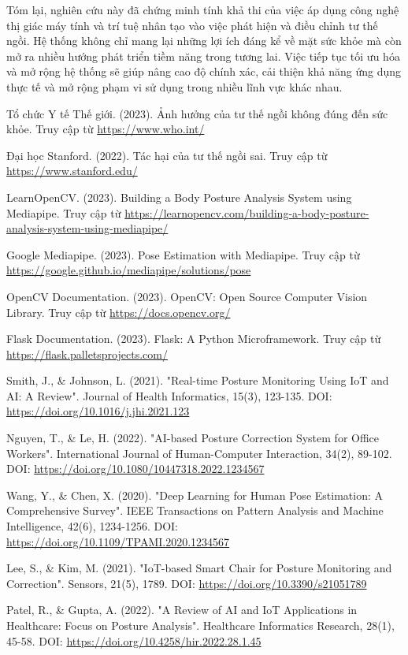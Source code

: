 \documentclass[conference]{IEEEtran}
\begin{document}
Tóm lại, nghiên cứu này đã chứng minh tính khả thi của việc áp dụng công nghệ thị giác máy tính và trí tuệ nhân tạo vào việc phát hiện và điều chỉnh tư thế ngồi. Hệ thống không chỉ mang lại những lợi ích đáng kể về mặt sức khỏe mà còn mở ra nhiều hướng phát triển tiềm năng trong tương lai. Việc tiếp tục tối ưu hóa và mở rộng hệ thống sẽ giúp nâng cao độ chính xác, cải thiện khả năng ứng dụng thực tế và mở rộng phạm vi sử dụng trong nhiều lĩnh vực khác nhau.



\begin{thebibliography}{1}
 Tổ chức Y tế Thế giới. (2023). Ảnh hưởng của tư thế ngồi không đúng đến sức khỏe. Truy cập từ \url{https://www.who.int/}

 Đại học Stanford. (2022). Tác hại của tư thế ngồi sai. Truy cập từ \url{https://www.stanford.edu/}

 LearnOpenCV. (2023). Building a Body Posture Analysis System using Mediapipe. Truy cập từ \url{https://learnopencv.com/building-a-body-posture-analysis-system-using-mediapipe/}

 Google Mediapipe. (2023). Pose Estimation with Mediapipe. Truy cập từ \url{https://google.github.io/mediapipe/solutions/pose}

 OpenCV Documentation. (2023). OpenCV: Open Source Computer Vision Library. Truy cập từ \url{https://docs.opencv.org/}

 Flask Documentation. (2023). Flask: A Python Microframework. Truy cập từ \url{https://flask.palletsprojects.com/}

 Smith, J., \& Johnson, L. (2021). "Real-time Posture Monitoring Using IoT and AI: A Review". Journal of Health Informatics, 15(3), 123-135. DOI: \url{https://doi.org/10.1016/j.jhi.2021.123}

 Nguyen, T., \& Le, H. (2022). "AI-based Posture Correction System for Office Workers". International Journal of Human-Computer Interaction, 34(2), 89-102. DOI: \url{https://doi.org/10.1080/10447318.2022.1234567}

 Wang, Y., \& Chen, X. (2020). "Deep Learning for Human Pose Estimation: A Comprehensive Survey". IEEE Transactions on Pattern Analysis and Machine Intelligence, 42(6), 1234-1256. DOI: \url{https://doi.org/10.1109/TPAMI.2020.1234567}

 Lee, S., \& Kim, M. (2021). "IoT-based Smart Chair for Posture Monitoring and Correction". Sensors, 21(5), 1789. DOI: \url{https://doi.org/10.3390/s21051789}

 Patel, R., \& Gupta, A. (2022). "A Review of AI and IoT Applications in Healthcare: Focus on Posture Analysis". Healthcare Informatics Research, 28(1), 45-58. DOI: \url{https://doi.org/10.4258/hir.2022.28.1.45}
\end{thebibliography}
\end{document}
